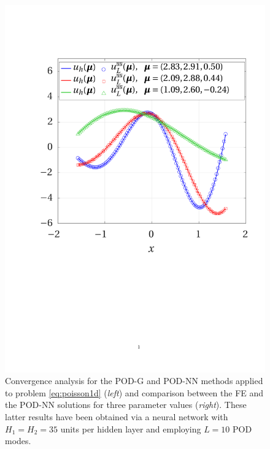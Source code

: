 \documentclass{elsarticle}
\numberwithin{equation}{section}
\theoremstyle{theorem}
\theoremstyle{definition}
\theoremstyle{remark}
\theoremstyle{proposition}
\numberwithin{figure}{section}
\begin{document}
\begin{figure}[b!]
			\includegraphics[scale = 0.385, trim = {1.5cm 9cm 1cm 3.5cm}, clip]{poisson1d_3_fe_vs_podnn}
			
			\vspace*{-0.2cm}
			
			\caption{Convergence analysis for the POD-G and POD-NN methods applied to problem \eqref{eq:poisson1d} (\emph{left}) and comparison between the FE and the POD-NN solutions for three parameter values (\emph{right}). These latter results have been obtained via a neural network with $H_1 = H_2 = 35$ units per hidden layer and employing $L = 10$ POD modes.}
			\label{fig:poisson1d-fig2}
		\end{figure}
			
\end{document}
